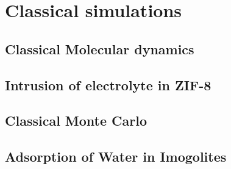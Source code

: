 \documentclass[thesis]{subfiles}
\begin{document}
\chapter{Classical simulations}

\section{Classical Molecular dynamics}

\section{Intrusion of electrolyte in ZIF-8}

\section{Classical Monte Carlo}

\section{Adsorption of Water in Imogolites}
\end{document}
